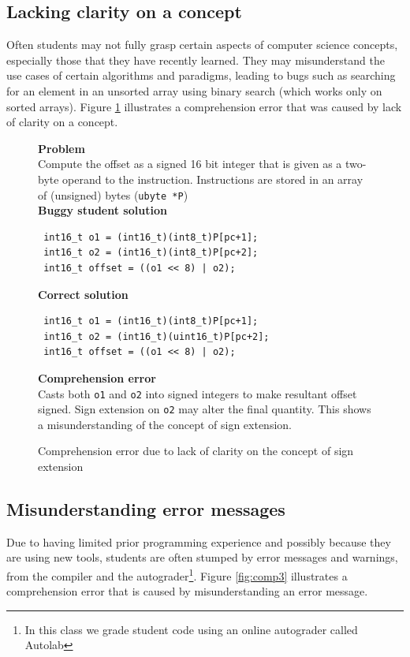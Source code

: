 \documentclass{sig-alternate}
\begin{document}
\subsection{Lacking clarity on a concept}
\label{sec:comp2}
Often students may not fully grasp certain aspects of computer science concepts, especially those that they have recently learned. They may misunderstand the use cases of certain algorithms and paradigms, leading to bugs such as searching for an element in an unsorted array using binary search (which works only on sorted arrays). Figure \ref{fig:comp2} illustrates a comprehension error that was caused by lack of clarity on a concept.

\begin{figure}
\begin{framed}
\setlength{\parindent}{0cm}
\textbf{Problem}\\
Compute the offset as a signed 16 bit integer that is given as a two-byte operand	to the instruction. Instructions are stored in an array of (unsigned) bytes (\verb|ubyte *P|) \\

\textbf{Buggy student solution}
\vspace{-0.05in}
\begin{verbatim}
 int16_t o1 = (int16_t)(int8_t)P[pc+1];
 int16_t o2 = (int16_t)(int8_t)P[pc+2];
 int16_t offset = ((o1 << 8) | o2);
\end{verbatim}

\textbf{Correct solution}
\vspace{-0.05in}
\begin{verbatim}
 int16_t o1 = (int16_t)(int8_t)P[pc+1];
 int16_t o2 = (int16_t)(uint16_t)P[pc+2];
 int16_t offset = ((o1 << 8) | o2);
\end{verbatim}

\textbf{Comprehension error}\\
Casts both \verb|o1| and \verb|o2| into signed integers to make resultant offset signed. Sign extension on \verb|o2| may alter the final quantity. This shows a misunderstanding of the concept of sign extension.

\end{framed}
\vspace{-0.1in}
\caption{Comprehension error due to lack of clarity on the concept of sign extension}
\label{fig:comp2}
\end{figure}

\subsection{Misunderstanding error messages}
Due to having limited prior programming experience and possibly because they are using new tools, students are often stumped by error messages and warnings, from the compiler and the autograder\footnote{In this class we grade student code using an online autograder called Autolab}. Figure \ref{fig:comp3} illustrates a comprehension error that is caused by misunderstanding an error message.
\end{document}

